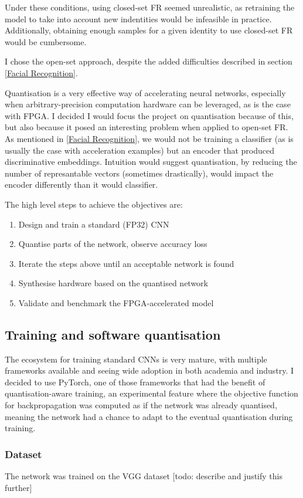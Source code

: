 \documentclass[12pt]{article}
\begin{document}
Under these conditions, using closed-set FR seemed unrealistic, as retraining the model to take
into account new indentities would be infeasible in practice. Additionally, obtaining
enough samples for a given identity to use closed-set FR would be cumbersome.

I chose the open-set approach, despite the added difficulties described in section \ref{Facial Recognition}.

Quantisation is a very effective way of accelerating neural networks, especially when 
arbitrary-precision computation hardware can be leveraged, as is the case with FPGA.
I decided I would focus the project on quantisation because of this, but also because
it posed an interesting problem when applied to open-set FR. As mentioned in \ref{Facial Recognition},
we would not be training a classifier (as is usually the case with acceleration examples) but an
encoder that produced discriminative embeddings. Intuition would suggest quantisation, 
by reducing the number of represantable vectors (sometimes drastically), would impact the 
encoder differently than it would classifier.

The high level steps to achieve the objectives are:
\begin{enumerate}
	\item Design and train a standard (FP32) CNN
	\item Quantise parts of the network, observe accuracy loss
	\item Iterate the steps above until an acceptable network is found
	\item Synthesise hardware based on the quantised network
	\item Validate and benchmark the FPGA-accelerated model
\end{enumerate}

\subsection{Training and software quantisation}
The ecosystem for training standard CNNs is very mature, with multiple frameworks available
and seeing wide adoption in both academia and industry. I decided to use PyTorch, one 
of those frameworks that had the benefit of quantisation-aware training, an experimental 
feature where the objective function for backpropagation was computed as if the network
was already quantised, meaning the network had a chance to adapt to the eventual quantisation
during training.

\subsubsection{Dataset}
The network was trained on the VGG dataset [todo: describe and justify this further]
\end{document}
